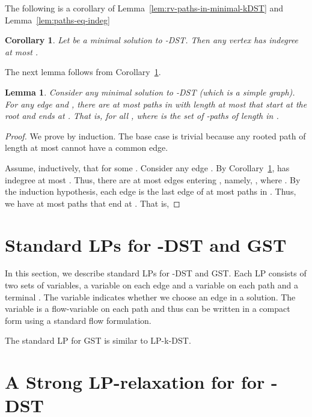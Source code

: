 \documentclass[11pt]{article}
\newtheorem{lemma}[theorem]{Lemma}
\newtheorem{corollary}[theorem]{Corollary}
\theoremstyle{definition}
\theoremstyle{remark}
\begin{document}
The following is a corollary of Lemma~\ref{lem:rv-paths-in-minimal-kDST}
and Lemma~\ref{lem:paths-eq-indeg}
\begin{corollary}
\label{cor:kdst-maxdeg-k}
Let  be a minimal solution to -DST.
Then any vertex  has indegree at most .
\end{corollary}

The next lemma follows from Corollary~\ref{cor:kdst-maxdeg-k}.

\begin{lemma}
\label{lem:no-of-paths-k-DST}
Consider any minimal solution  to -DST
(which is a simple graph).
For any edge  and , 
there are at most  paths in  with length at most 
that start at the root  and ends at .
That is, 
 for all ,
where  is 
the set of -paths of length  in . 
\end{lemma}
\begin{proof}
We prove by induction.
The base case  is trivial because any rooted path of
length at most  cannot have a common edge.

Assume, inductively, that  
for some . 
Consider any edge .
By Corollary~\ref{cor:kdst-maxdeg-k},  has indegree at most .
Thus, there are at most  edges entering , namely,
, where . 
By the induction hypothesis, each edge is the last edge of at most
 paths in . 
Thus, we have at most  paths that
end at . That is,

\end{proof}




\section{Standard LPs for -DST and GST}
\label{sec:standard-LPs}

In this section, we describe standard LPs for -DST and GST. 
Each LP consists of two sets of variables, 
a variable  on each edge  and 
a variable  on each path  and a terminal .
The variable  indicates whether we choose an edge 
in a solution.
The variable  is a flow-variable on each path and 
thus can be written in a compact form 
using a standard flow formulation.



The standard LP for GST is similar to LP-k-DST.



\section{A Strong LP-relaxation for for -DST}
\label{sec:strong-LP-k-DST}
\end{document}
